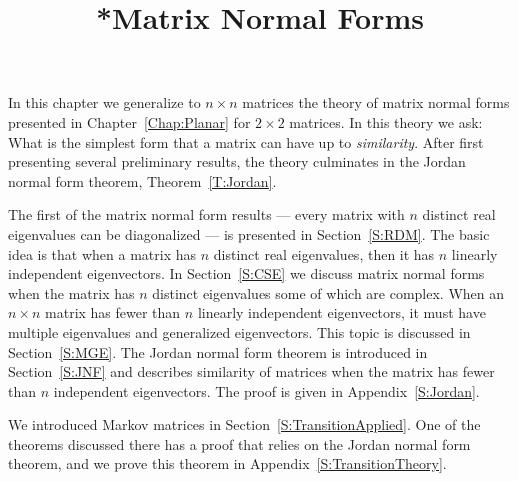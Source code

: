 \documentclass{ximera}
\title{*Matrix Normal Forms}
\begin{document}
\begin{abstract}
\end{abstract}
\maketitle

\normalsize
 
In this chapter we generalize to $n\times n$ matrices the theory of matrix 
normal forms presented in Chapter~\ref{Chap:Planar} for $2\times 2$ 
matrices.  In this theory we ask: What is the simplest form that a matrix 
can have up to {\em similarity\/}.  After first presenting several 
preliminary results, the theory culminates in the Jordan normal form theorem, Theorem~\ref{T:Jordan}. 

The first of the matrix normal form results --- every matrix with 
$n$ distinct real eigenvalues can be diagonalized --- is presented 
in Section~\ref{S:RDM}.  The basic idea is that when a matrix has $n$
distinct real eigenvalues, then it has $n$ linearly independent 
eigenvectors.  In Section~\ref{S:CSE} we discuss matrix normal forms 
when the matrix has $n$ distinct eigenvalues some of which are complex.  
When an $n\times n$ matrix has fewer than $n$ linearly independent 
eigenvectors, it must have multiple eigenvalues and generalized eigenvectors.  
This topic is discussed in Section~\ref{S:MGE}.  The Jordan normal form theorem 
is introduced in Section~\ref{S:JNF} and describes similarity of matrices when 
the matrix has fewer than $n$ independent eigenvectors.  The proof is 
given in Appendix~\ref{S:Jordan}.

We introduced Markov matrices in Section~\ref{S:TransitionApplied}.  
One of the theorems discussed there has a proof that relies on the 
Jordan normal form theorem, and we prove this theorem in 
Appendix~\ref{S:TransitionTheory}.
 
\end{document}
